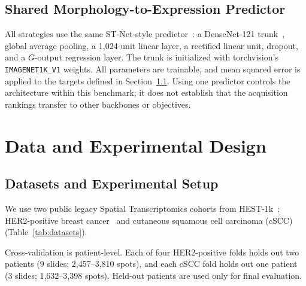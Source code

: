 \documentclass[]{spie}
\begin{document}
\subsection{Shared Morphology-to-Expression Predictor}
\label{sec:predictor}

All strategies use the same ST-Net-style predictor~\cite{he2020integrating}: a DenseNet-121 trunk~\cite{huang2017densely}, global average pooling, a 1,024-unit linear layer, a rectified linear unit, dropout, and a $G$-output regression layer. The trunk is initialized with torchvision's \texttt{IMAGENET1K\_}\allowbreak\texttt{V1} weights. All parameters are trainable, and mean squared error is applied to the targets defined in Section~\ref{sec:setup}. Using one predictor controls the architecture within this benchmark; it does not establish that the acquisition rankings transfer to other backbones or objectives.

\section{Data and Experimental Design}
\label{sec:data}

\subsection{Datasets and Experimental Setup}
\label{sec:setup}

We use two public legacy Spatial Transcriptomics cohorts from HEST-1k~\cite{jaume2024hest}: HER2-positive breast cancer~\cite{andersson2021spatial} and cutaneous squamous cell carcinoma (cSCC)~\cite{ji2020multimodal} (Table~\ref{tab:datasets}).

\begin{table}[htbp]
\centering
\caption{Cohorts used in the conference benchmark. Counts reflect HEST-1k preprocessing.}
\label{tab:datasets}
\end{table}

Cross-validation is patient-level. Each of four HER2-positive folds holds out two patients (9 slides; 2,457--3,810 spots), and each cSCC fold holds out one patient (3 slides; 1,632--3,398 spots). Held-out patients are used only for final evaluation.
\end{document}
